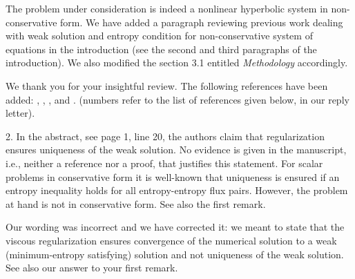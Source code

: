 \documentclass{article}
\newcommand{\tcr}[1]{\textcolor{red}{#1}}
\newcommand{\tcg}[1]{\textcolor{green}{#1}}
\begin{document}
The problem under consideration is indeed a nonlinear hyperbolic system in non-conservative form. 
We have added a paragraph reviewing previous work dealing with weak solution and entropy condition for 
non-conservative system of equations in the introduction (see the second and third paragraphs of the introduction). We also modified
the section 3.1 entitled {\it Methodology} accordingly.

We thank you for your insightful review. The following references have been added: \cite{alouges_merlet_2004}, \cite{lefloch_1989},
\cite{lefloch_1988}, \cite{dlm} and \cite{bianchini_bressan_2005}.
(numbers refer to the list of references given below, in our reply letter).

\bigskip


{\color{blue}
2. In the abstract, see page 1, line 20, the authors claim that regularization ensures
uniqueness of the weak solution. No evidence is given in the manuscript, i.e., neither
a reference nor a proof, that justifies this statement. For scalar problems in 
conservative form it is well-known that uniqueness is ensured if an entropy inequality
holds for all entropy-entropy flux pairs. However, the problem at hand is not in
conservative form. See also the first remark.}

Our wording was incorrect and we have corrected it: we meant to state that the viscous regularization 
ensures convergence of the numerical solution to a weak (minimum-entropy satisfying) solution 
and not uniqueness of the weak solution. See also our answer to your first remark.

\bigskip
\end{document}
